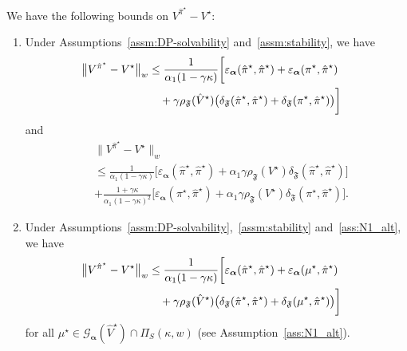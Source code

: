 \documentclass[letterpaper, 10pt]{IEEEtran}
\newcommand*\ALPHABET{\mathcal}
\newcommand*\tuple{\kappa, w}
\newcommand\F{\mathfrak{F}}
\begin{document}
\begin{theorem}\label{thm:weighted_IPM}
    We have the following bounds on $V^{\hat \pi^\star} - V^\star$:
    \begin{enumerate}
        \item Under Assumptions~\ref{assm:DP-solvability} and~\ref{assm:stability}, we have
        \begin{align*}
                \hskip -1em \bigl\| V^{\hat \pi^\star} - V^\star \bigr\|_w &\leq 
                \frac{1}{\alpha_1(1-\gamma\kappa)}\biggl[ \varepsilon_{\boldsymbol{\alpha}}(\hat\pi^\star,\hat\pi^\star) +\varepsilon_{\boldsymbol{\alpha}}(\pi^\star,\hat\pi^\star)   \\ 
                &\quad +\gamma \rho_{\F}(\hat V^\star) \bigl( \delta_{\mathfrak F}(\hat\pi^\star,\hat\pi^\star) 
                +\delta_{\mathfrak F}(\pi^\star,\hat\pi^\star)\bigr)  \biggr]
        \end{align*}
        and 
        \begin{align*}
            &
            \bigl\| V^{\hat \pi^\star} - V^\star \bigr\|_w \\
            & \leq
            \frac{1}{\alpha_1(1-\gamma\kappa)}\bigl[\varepsilon_{\boldsymbol{\alpha}}(\hat\pi^\star,\hat\pi^\star) 
             +\alpha_1\gamma\rho_{\mathfrak F}(V^\star)\delta_{\mathfrak F}(\hat\pi^\star,\hat\pi^\star)\bigr] \\
            & + \frac{1+\gamma\kappa}{\alpha_1(1-\gamma\kappa)^2}\bigl[\varepsilon_{\boldsymbol{\alpha}}(\pi^\star,\hat\pi^\star) 
             + \alpha_1\gamma\rho_{\mathfrak F}(V^\star)\delta_{\mathfrak F}(\pi^\star,\hat\pi^\star)\bigr].
        \end{align*}
        \item Under Assumptions~\ref{assm:DP-solvability},~\ref{assm:stability} and~\ref{ass:N1_alt}, we have
        \begin{align*}
                \hskip -1em \bigl\| V^{\hat \pi^\star} - V^\star \bigr\|_w &\leq 
                \frac{1}{\alpha_1(1-\gamma\kappa)}\biggl[ \varepsilon_{\boldsymbol{\alpha}}(\hat\pi^\star,\hat\pi^\star) +\varepsilon_{\boldsymbol{\alpha}}(\mu^\star,\hat\pi^\star)   \\ 
                &\quad +\gamma \rho_{\F}(\hat V^\star) \bigl( \delta_{\mathfrak F}(\hat\pi^\star,\hat\pi^\star) 
                +\delta_{\mathfrak F}(\mu^\star,\hat\pi^\star)\bigr)  \biggr]
        \end{align*}
        for all $\mu^\star \in \ALPHABET G_{\boldsymbol{\alpha}}(\hat V^\star) \cap  \Pi_S(\tuple)$ (see Assumption~\ref{ass:N1_alt}).

\end{enumerate}
\end{theorem}
\end{document}

